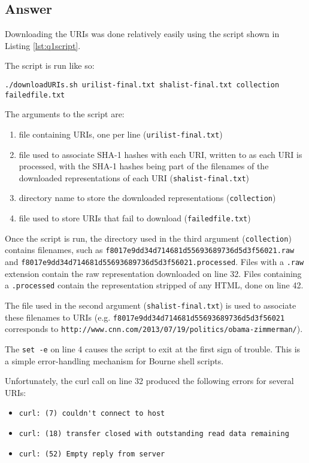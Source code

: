 \documentclass[letterpaper,11pt]{article}
\begin{document}
\newpage
\subsection*{Answer}

Downloading the URIs was done relatively easily using the script shown in Listing \ref{lst:q1script}.

The script is run like so:
\begin{lstlisting}[frame=single]
./downloadURIs.sh urilist-final.txt shalist-final.txt collection failedfile.txt
\end{lstlisting}

The arguments to the script are:
\begin{enumerate}
\item file containing URIs, one per line (\verb+urilist-final.txt+)
\item file used to associate SHA-1 hashes with each URI, written to as each URI is processed, with the SHA-1 hashes being part of the filenames of the downloaded representations of each URI (\verb+shalist-final.txt+)
\item directory name to store the downloaded representations (\verb+collection+)
\item file used to store URIs that fail to download (\verb+failedfile.txt+)
\end{enumerate}

Once the script is run, the directory used in the third argument (\verb+collection+) contains filenames, such as \verb+f8017e9dd34d714681d55693689736d5d3f56021.raw+ and \verb+f8017e9dd34d714681d55693689736d5d3f56021.processed+.  Files with a \verb+.raw+ extension contain the raw representation downloaded on line 32.  Files containing a \verb+.processed+ contain the representation stripped of any HTML, done on line 42.

The file used in the second argument (\verb+shalist-final.txt+) is used to associate these filenames to URIs (e.g. \verb+f8017e9dd34d714681d55693689736d5d3f56021+ corresponds to \verb+http://www.cnn.com/2013/07/19/politics/obama-zimmerman/+).

The \verb+set -e+ on line 4 causes the script to exit at the first sign of trouble.  This is a simple error-handling mechanism for Bourne shell scripts.

Unfortunately, the curl call on line 32 produced the following errors for several URIs:
\begin{itemize}
\item \verb+curl: (7) couldn't connect to host+
\item \verb+curl: (18) transfer closed with outstanding read data remaining+
\item \verb+curl: (52) Empty reply from server+
\end{itemize}
\end{document}

